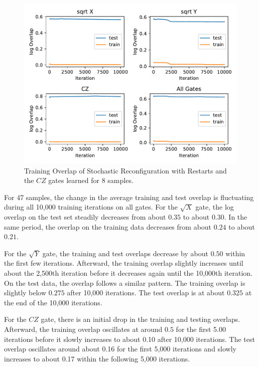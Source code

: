 \begin{figure}[H]
  \centering
  \includegraphics[width=\textwidth]{figures/results/SR-restarts-learned/avgOverlap_8.pdf}
  \caption[Training Overlap of Stochastic Reconfiguration with Restarts Learned]{Training 
  Overlap of Stochastic Reconfiguration with Restarts and the $CZ$ gates learned for 8 samples.}
  \label{fig:sr_restarts_overlap_8}
\end{figure}

For 47 samples, the change in the average training and test overlap is fluctuating during all 10,000
training iterations on all gates. For the 
$\sqrt{X}$ gate, the log overlap on the test set steadily decreases from 
about $0.35$ to about $0.30$. In the same period, the overlap on the training data decreases from about $0.24$ to about $0.21$.

For the $\sqrt{Y}$ gate, the training and test overlaps decrease by about $0.50$ within the first few iterations. 
Afterward, the training overlap slightly increases until about the 2,500th iteration before it decreases again 
until the 10,000th iteration. On the test data, the overlap follows a similar pattern. The 
training overlap is slightly below $0.275$ after 10,000 iterations. The test overlap is at about $0.325$ 
at the end of the 10,000 iterations. 

For the $CZ$ gate, there is an initial drop in the training and testing overlaps. Afterward, 
the training overlap oscillates at around $0.5$ for the first 5.00 iterations before it slowly increases to about 
0.10 after 10,000 iterations. The test overlap oscillates around about 0.16 for the first 5,000 iterations and 
slowly increases to about 0.17 within the following 5,000 iterations. 

